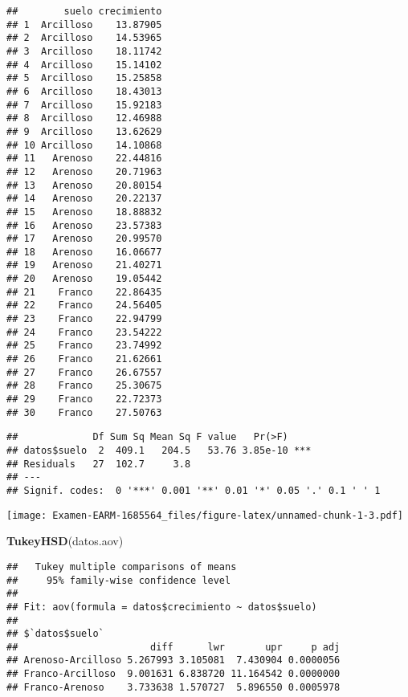 \documentclass[
]{article}
\newenvironment{Shaded}{\begin{snugshade}}{\end{snugshade}}
\newcommand{\FunctionTok}[1]{\textcolor[rgb]{0.13,0.29,0.53}{\textbf{#1}}}
\newcommand{\NormalTok}[1]{#1}
\newcommand{\OtherTok}[1]{\textcolor[rgb]{0.56,0.35,0.01}{#1}}
\newcommand{\SpecialCharTok}[1]{\textcolor[rgb]{0.81,0.36,0.00}{\textbf{#1}}}
\begin{document}
\begin{verbatim}
##        suelo crecimiento
## 1  Arcilloso    13.87905
## 2  Arcilloso    14.53965
## 3  Arcilloso    18.11742
## 4  Arcilloso    15.14102
## 5  Arcilloso    15.25858
## 6  Arcilloso    18.43013
## 7  Arcilloso    15.92183
## 8  Arcilloso    12.46988
## 9  Arcilloso    13.62629
## 10 Arcilloso    14.10868
## 11   Arenoso    22.44816
## 12   Arenoso    20.71963
## 13   Arenoso    20.80154
## 14   Arenoso    20.22137
## 15   Arenoso    18.88832
## 16   Arenoso    23.57383
## 17   Arenoso    20.99570
## 18   Arenoso    16.06677
## 19   Arenoso    21.40271
## 20   Arenoso    19.05442
## 21    Franco    22.86435
## 22    Franco    24.56405
## 23    Franco    22.94799
## 24    Franco    23.54222
## 25    Franco    23.74992
## 26    Franco    21.62661
## 27    Franco    26.67557
## 28    Franco    25.30675
## 29    Franco    22.72373
## 30    Franco    27.50763
\end{verbatim}

\begin{Shaded}
\end{Shaded}

\begin{verbatim}
##             Df Sum Sq Mean Sq F value   Pr(>F)    
## datos$suelo  2  409.1   204.5   53.76 3.85e-10 ***
## Residuals   27  102.7     3.8                     
## ---
## Signif. codes:  0 '***' 0.001 '**' 0.01 '*' 0.05 '.' 0.1 ' ' 1
\end{verbatim}

\begin{Shaded}
\end{Shaded}

\texttt{[image: Examen-EARM-1685564\_files/figure-latex/unnamed-chunk-1-3.pdf]}

\begin{Shaded}
\begin{Highlighting}[]
\FunctionTok{TukeyHSD}\NormalTok{(datos.aov)}
\end{Highlighting}
\end{Shaded}

\begin{verbatim}
##   Tukey multiple comparisons of means
##     95% family-wise confidence level
## 
## Fit: aov(formula = datos$crecimiento ~ datos$suelo)
## 
## $`datos$suelo`
##                       diff      lwr       upr     p adj
## Arenoso-Arcilloso 5.267993 3.105081  7.430904 0.0000056
## Franco-Arcilloso  9.001631 6.838720 11.164542 0.0000000
## Franco-Arenoso    3.733638 1.570727  5.896550 0.0005978
\end{verbatim}
\end{document}
